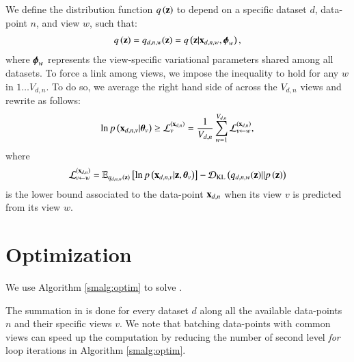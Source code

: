 We define the distribution function $q\left(\mathbf{z}\right)$ to depend on a specific dataset $d$, data-point $n$, and view $w$, such that:
\begin{equation}\label{smeq:q}
\begin{aligned}
q\left(\mathbf{z}\right) = q_{d,n,w}(\mathbf{z}) = q\left(\mathbf{z}|\mathbf{x}_{d,n,w}, \boldsymbol{\phi}_w\right),
\end{aligned}
\end{equation}
where $\boldsymbol{\phi}_w$ represents the view-specific variational parameters shared among all datasets.
To force a link among views, we impose the inequality  to hold for any $w$ in $1 \ldots V_{d,n}$.
To do so, we average the right hand side of  across the $V_{d,n}$ views and rewrite  as follows:
\begin{equation}\label{smeq:newLB}
\begin{aligned}
\ln p\left(\mathbf{x}_{d,n,v}|\boldsymbol{\theta}_v\right) \geq \mathcal{L}_v^{(\mathbf{x}_{d,n})} = \frac{1}{V_{d,n}} \sum_{w=1}^{V_{d,n}} \mathcal{L}_{v \leftarrow w}^{(\mathbf{x}_{d,n})},
\end{aligned}
\end{equation}
where
\begin{equation}\label{smeq:LBdnvw}
\begin{aligned}
\mathcal{L}_{v \leftarrow w}^{(\mathbf{x}_{d,n})} = \operatorname{\mathbb{E}}_{q_{d,n,w}(\mathbf{z})}\left[\ln p\left(\mathbf{x}_{d,n,v}|\mathbf{z}, \boldsymbol{\theta}_v\right)\right] - \operatorname{\mathcal{D}_{KL}}\left(q_{d,n,w}(\mathbf{z})||p\left(\mathbf{z}\right)\right)
\end{aligned}
\end{equation}
is the lower bound associated to the data-point $\mathbf{x}_{d,n}$ when its view $v$ is predicted from its view $w$.

\section{Optimization}
\label{sm:optimization}

We use Algorithm \ref{smalg:optim} to solve .

The summation in  is done for every dataset $d$ along all the available data-points $n$ and their specific views $v$.
We note that batching data-points with common views can speed up the computation by reducing the number of second level \textit{for} loop iterations in Algorithm \ref{smalg:optim}.


